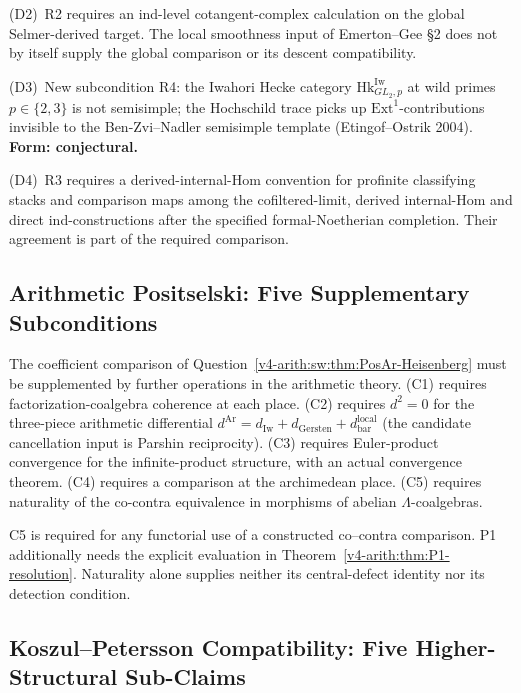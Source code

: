 (D2)~R2 requires an ind-level cotangent-complex calculation on the
global Selmer-derived target. The local smoothness input of
Emerton--Gee \S2 does not by itself supply the global comparison
or its descent compatibility.

(D3)~New subcondition R4: the Iwahori Hecke category
\(\mathrm{Hk}^{\mathrm{Iw}}_{GL_{2},p}\) at wild primes
\(p\in\{2,3\}\) is not semisimple; the Hochschild trace picks up
\(\mathrm{Ext}^{1}\)-contributions invisible to the Ben-Zvi--Nadler
semisimple template (Etingof--Ostrik 2004).
\textbf{Form: conjectural.}

(D4)~R3 requires a derived-internal-Hom convention for profinite
classifying stacks and comparison maps among the cofiltered-limit,
derived internal-Hom and direct ind-constructions after the specified
formal-Noetherian completion. Their agreement is part of the required
comparison.

\subsection{Arithmetic Positselski: Five Supplementary Subconditions}

The coefficient comparison of
Question~\ref{v4-arith:sw:thm:PosAr-Heisenberg} must be supplemented
by further operations in the arithmetic theory.
(C1) requires factorization-coalgebra coherence at each place.
(C2) requires \(d^{2}=0\) for the three-piece arithmetic differential
\(d^{\mathrm{Ar}}=d_{\mathrm{Iw}}+d_{\mathrm{Gersten}}+d_{\mathrm{bar}}^{\mathrm{local}}\)
(the candidate cancellation input is Parshin reciprocity).
(C3) requires Euler-product convergence for the infinite-product structure,
with an actual convergence theorem.
(C4) requires a comparison at the archimedean place.
(C5) requires naturality of the co-contra equivalence in morphisms of
abelian \(\Lambda\)-coalgebras.

C5 is required for any functorial use of a constructed co--contra
comparison. P1 additionally needs the explicit evaluation in
Theorem~\ref{v4-arith:thm:P1-resolution}. Naturality alone supplies
neither its central-defect identity nor its detection condition.

\subsection{Koszul--Petersson Compatibility: Five Higher-Structural Sub-Claims}

